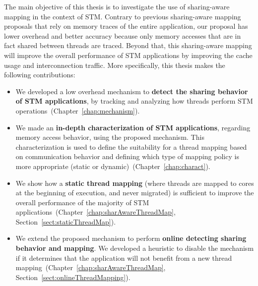 The main objective of this thesis is to investigate the use of sharing-aware mapping in the context of STM. %
	Contrary to previous sharing-aware mapping proposals that rely on memory traces of the entire application, our proposal has lower overhead and better accuracy because only memory accesses that are in fact shared between threads are traced. Beyond that, this sharing-aware mapping will improve the overall performance of STM applications by improving the cache usage and interconnection traffic. More specifically, this thesis makes the following contributions:

\begin{itemize}
	\item We developed a low overhead mechanism to \textbf{detect the sharing behavior of STM applications}, by tracking and analyzing how threads perform STM operations~(Chapter~\ref{chap:mechanism}).
	
	\item We made an \textbf{in-depth characterization of STM applications}, regarding memory access behavior, using the proposed mechanism. This characterization is used to define the suitability for a thread mapping based on communication behavior and defining which type of mapping policy is more appropriate (static or dynamic)~(Chapter~\ref{chap:charact}).
	
	\item We show how a \textbf{static thread mapping} (where threads are mapped to cores at the beginning of execution, and never migrated) is sufficient to improve the overall performance of the majority of STM applications~(Chapter~\ref{chap:sharAwareThreadMap}, Section~\ref{sect:staticThreadMap}). 
	
	\item We extend the proposed mechanism to perform \textbf{online detecting sharing behavior and mapping}. %
	We developed a heuristic to disable the mechanism if it determines that the application will not benefit from a new thread mapping~(Chapter~\ref{chap:sharAwareThreadMap}, Section~\ref{sect:onlineThreadMapping}). 
	
\end{itemize}


